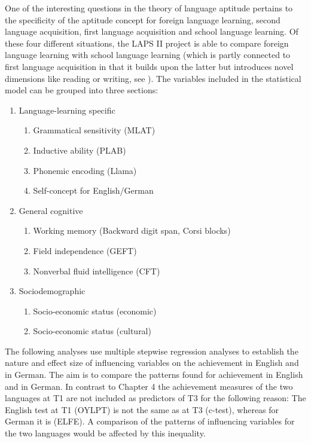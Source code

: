 \documentclass[output=paper]{langsci/langscibook}
\begin{document}
One of the interesting questions in the theory of language aptitude pertains to the specificity of the aptitude concept for foreign language learning, second language acquisition, first language acquisition and school language learning. Of these four different situations, the LAPS II project is able to compare foreign language learning with school language learning (which is partly connected to first language acquisition in that it builds upon the latter but introduces novel dimensions like reading or writing, see ). The variables included in the statistical model can be grouped into three sections:

\begin{enumerate}
\item Language-learning specific
   \begin{enumerate}[label=\alph*.]
   \item Grammatical sensitivity (MLAT)
   \item Inductive ability (PLAB)
   \item Phonemic encoding (Llama)
   \item Self-concept for English/German
   \end{enumerate}
\item General cognitive
   \begin{enumerate}[label=\alph*.]
   \item Working memory (Backward digit span, Corsi blocks)
   \item Field independence (GEFT)
   \item Nonverbal fluid intelligence (CFT)
   \end{enumerate}
\item Sociodemographic
   \begin{enumerate}[label=\alph*.]
   \item Socio-economic status (economic)
   \item Socio-economic status (cultural)
   \end{enumerate}
\end{enumerate}

The following analyses use multiple stepwise regression analyses to establish the nature and effect size of influencing variables on the achievement in English and in German. The aim is to compare the patterns found for achievement in English and in German. In contrast to Chapter 4 the achievement measures of the two languages at T1 are not included as predictors of T3 for the following reason: The English test at T1 (OYLPT) is not the same as at T3 (c-test), whereas for German it is (ELFE). A comparison of the patterns of influencing variables for the two languages would be affected by this inequality. 
\end{document}
